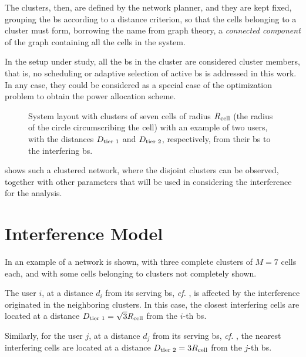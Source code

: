 The clusters, then, are defined by the network planner, and they are kept fixed,
grouping the \gls{bs} according to a distance criterion, so that the cells
belonging to a cluster must form, borrowing the name from graph theory, a
\emph{connected component} of the graph containing all the cells in the system.

In the setup under study, all the \gls{bs} in the cluster are considered cluster
members, that is, no scheduling or adaptive selection of active \gls{bs} is
addressed in this work. In any case, they could be considered as a special case
of the optimization problem to obtain the power allocation scheme.

\begin{figure}[t]
\begin{center}
    \hspace*{1mm}
\end{center}
\caption{System layout with clusters of seven cells of radius $R_{\text{cell}}$ (the
radius of the circle circumscribing the cell) with an example of two users,
with the distances $D_{\text{tier 1}}$ and $D_{\text{tier 2}}$, respectively, from their \gls{bs} to
the interfering \gls{bs}.}
\label{fig:achiev_cluster_layout}
\end{figure}

 shows such a clustered network, where the
disjoint clusters can be observed, together with other parameters that will be
used in considering the interference for the analysis.

\section{Interference Model}\label{sec:achiev_interf}

In  an example of a network is shown, with three
complete clusters of $M=7$ cells each, and with some cells belonging to clusters
not completely shown.

The user $i$, at a distance $d_i$ from its serving \gls{bs}, \emph{cf.}
, is affected by the interference originated in the
neighboring clusters. In this case, the closest interfering cells are located at
a distance $D_{\text{tier 1}} = \sqrt{3} R_{\text{cell}}$ from the $i$-th \gls{bs}.

Similarly, for the user $j$, at a distance $d_j$ from its serving \gls{bs},
\emph{cf.} , the nearest interfering cells are located at
a distance $D_{\text{tier 2}} = 3R_{\text{cell}}$ from the $j$-th \gls{bs}.


